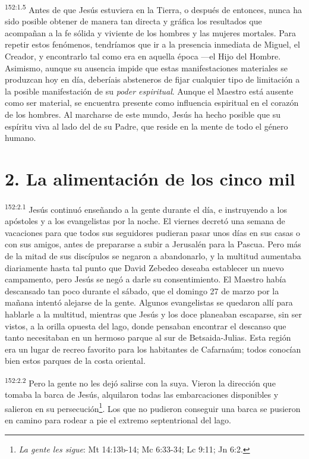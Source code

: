 \par
\textsuperscript{152:1.5} Antes de que Jesús estuviera en la Tierra, o después de entonces, nunca ha sido posible obtener de manera tan directa y gráfica los resultados que acompañan a la fe sólida y viviente de los hombres y las mujeres mortales. Para repetir estos fenómenos, tendríamos que ir a la presencia inmediata de Miguel, el Creador, y encontrarlo tal como era en aquella época ---el Hijo del Hombre. Asimismo, aunque su ausencia impide que estas manifestaciones materiales se produzcan hoy en día, deberíais absteneros de fijar cualquier tipo de limitación a la posible manifestación de su \textit{poder espiritual}. Aunque el Maestro está ausente como ser material, se encuentra presente como influencia espiritual en el corazón de los hombres. Al marcharse de este mundo, Jesús ha hecho posible que su espíritu viva al lado del de su Padre, que reside en la mente de todo el género humano.

\section*{2. La alimentación de los cinco mil}
\par
\textsuperscript{152:2.1} Jesús continuó enseñando a la gente durante el día, e instruyendo a los apóstoles y a los evangelistas por la noche. El viernes decretó una semana de vacaciones para que todos sus seguidores pudieran pasar unos días en sus casas o con sus amigos, antes de prepararse a subir a Jerusalén para la Pascua. Pero más de la mitad de sus discípulos se negaron a abandonarlo, y la multitud aumentaba diariamente hasta tal punto que David Zebedeo deseaba establecer un nuevo campamento, pero Jesús se negó a darle su consentimiento. El Maestro había descansado tan poco durante el sábado, que el domingo 27 de marzo por la mañana intentó alejarse de la gente. Algunos evangelistas se quedaron allí para hablarle a la multitud, mientras que Jesús y los doce planeaban escaparse, sin ser vistos, a la orilla opuesta del lago, donde pensaban encontrar el descanso que tanto necesitaban en un hermoso parque al sur de Betsaida-Julias. Esta región era un lugar de recreo favorito para los habitantes de Cafarnaúm; todos conocían bien estos parques de la costa oriental.

\par
\textsuperscript{152:2.2} Pero la gente no les dejó salirse con la suya. Vieron la dirección que tomaba la barca de Jesús, alquilaron todas las embarcaciones disponibles y salieron en su persecución\footnote{\textit{La gente les sigue}: Mt 14:13b-14; Mc 6:33-34; Lc 9:11; Jn 6:2.}. Los que no pudieron conseguir una barca se pusieron en camino para rodear a pie el extremo septentrional del lago.

